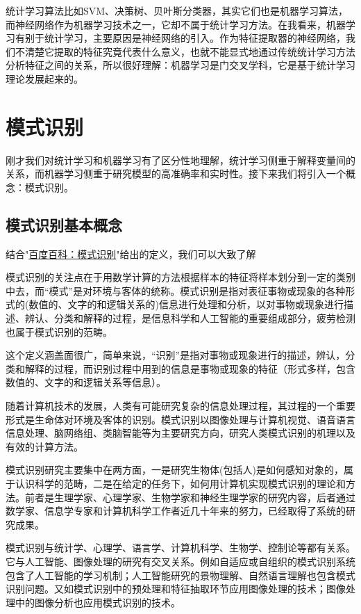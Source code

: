 统计学习算法比如SVM、决策树、贝叶斯分类器，其实它们也是机器学习算法，而神经网络作为机器学习技术之一，它却不属于统计学习方法。在我看来，机器学习有别于统计学习，主要原因是神经网络的引入。作为特征提取器的神经网络，我们不清楚它提取的特征究竟代表什么意义，也就不能显式地通过传统统计学习方法分析特征之间的关系，所以很好理解：机器学习是门交叉学科，它是基于统计学习理论发展起来的。

\section{模式识别}

刚才我们对统计学习和机器学习有了区分性地理解，统计学习侧重于解释变量间的关系，而机器学习侧重于研究模型的高准确率和实时性。接下来我们将引入一个概念：模式识别。

\subsection{模式识别基本概念}

结合"\href{https://baike.baidu.com/item/%E6%A8%A1%E5%BC%8F%E8%AF%86%E5%88%AB/295301?fr=aladdin}{百度百科：模式识别}"给出的定义，我们可以大致了解

模式识别的关注点在于用数学计算的方法根据样本的特征将样本划分到一定的类别中去，而“模式”是对环境与客体的统称。模式识别是指对表征事物或现象的各种形式的(数值的、文字的和逻辑关系的)信息进行处理和分析，以对事物或现象进行描述、辨认、分类和解释的过程，是信息科学和人工智能的重要组成部分，疲劳检测也属于模式识别的范畴。

这个定义涵盖面很广，简单来说，“识别”是指对事物或现象进行的描述，辨认，分类和解释的过程，而识别过程中用到的信息是事物或现象的特征（形式多样，包含数值的、文字的和逻辑关系等信息）。

随着计算机技术的发展，人类有可能研究复杂的信息处理过程，其过程的一个重要形式是生命体对环境及客体的识别。模式识别以图像处理与计算机视觉、语音语言信息处理、脑网络组、类脑智能等为主要研究方向，研究人类模式识别的机理以及有效的计算方法。

模式识别研究主要集中在两方面，一是研究生物体(包括人)是如何感知对象的，属于认识科学的范畴，二是在给定的任务下，如何用计算机实现模式识别的理论和方法。前者是生理学家、心理学家、生物学家和神经生理学家的研究内容，后者通过数学家、信息学专家和计算机科学工作者近几十年来的努力，已经取得了系统的研究成果。

模式识别与统计学、心理学、语言学、计算机科学、生物学、控制论等都有关系。它与人工智能、图像处理的研究有交叉关系。例如自适应或自组织的模式识别系统包含了人工智能的学习机制；人工智能研究的景物理解、自然语言理解也包含模式识别问题。又如模式识别中的预处理和特征抽取环节应用图像处理的技术；图像处理中的图像分析也应用模式识别的技术。

